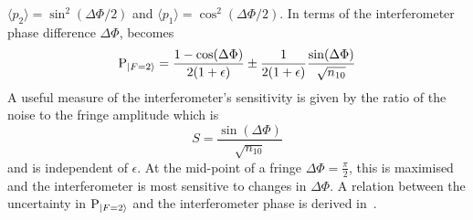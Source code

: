 $\langle p_2 \rangle = \sin^2(\Delta \Phi/2)$ and $ \langle p_1
\rangle = \cos^2(\Delta \Phi/2)$. In terms of the interferometer phase
difference $\Delta \Phi$,  becomes
\begin{equation}
  \text{P}_{\ket{F=2}} = \frac{1-\cos(\Delta \Phi)}{2(1+\epsilon)} \pm
  \frac{1}{2(1+\epsilon)}\frac{\sin(\Delta \Phi)}{\sqrt{n_{10}}}
\end{equation}
A useful measure of the interferometer's sensitivity is given by the
ratio of the noise to the fringe amplitude which is
\begin{equation}
  S = \frac{\sin(\Delta\Phi)}{\sqrt{n_{10}}}
  \label{eq:sens_proj}
\end{equation}
and is independent of $\epsilon$. At the mid-point
of a fringe $\Delta \Phi = \frac{\pi}{2}$, this is maximised and the
interferometer is most sensitive to changes in $\Delta \Phi$. A
relation between the uncertainty in $\text{P}_{\ket{F=2}}$ and the
interferometer phase is derived in~.

